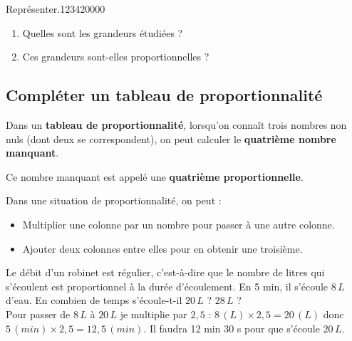 \begin{pageAD}
\begin{ExoCad}{Représenter.}{1234}{2}{0}{0}{0}{0}
\begin{enumerate}[leftmargin=*]
\item Quelles sont les grandeurs étudiées ? 
\item Ces grandeurs sont-elles proportionnelles ? 
\end{enumerate}
 
\end{ExoCad}

 

\end{pageAD}  
\begin{pageCours} 

\section{Compléter un tableau de proportionnalité}

\begin{Def}
Dans un \textbf{tableau de proportionnalité}, lorsqu'on connaît trois nombres non nuls (dont deux se correspondent), on peut calculer le \textbf{quatrième nombre manquant}.

Ce nombre manquant est appelé une \textbf{quatrième proportionnelle}.
\end{Def}

\begin{Pp}
Dans une situation de proportionnalité, on peut :
\begin{itemize}[leftmargin=*]
\item Multiplier une colonne par un nombre pour passer à une autre colonne.
\item Ajouter deux colonnes entre elles pour en obtenir une troisième.
\end{itemize}
\end{Pp} 

\begin{Ex}
Le débit d'un robinet est régulier, c'est-à-dire que le nombre de litres qui s'écoulent est proportionnel à la durée d'écoulement. En 5 min, il s'écoule $8 \,L$ d'eau. En combien de temps s'écoule-t-il $20 \,L$ ? $28\,L$ ?\\

Pour passer de $8\,L$ à $20\,L$ je multiplie par $2,5$ : $8\,(L)\times2,5=20\,(L)$ donc $5\,(min)\times2,5=12,5\,(min)$. Il faudra 12 min 30 s pour que s'écoule $20\,L$.\\



\end{Ex}
\end{pageCours}
